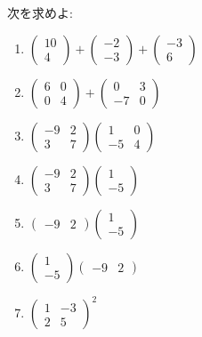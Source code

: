 \begin{quiz}
  次を求めよ:
  \begin{enumerate}
  \item
    $\begin{pmatrix}10\\4\end{pmatrix}+\begin{pmatrix}-2\\-3\end{pmatrix}+\begin{pmatrix}-3\\6\end{pmatrix}$
  \item
    $\begin{pmatrix}6&0\\0&4\end{pmatrix}+\begin{pmatrix}0&3\\-7&0\end{pmatrix}$
  \item
    $\begin{pmatrix}-9&2\\3&7\end{pmatrix}\begin{pmatrix}1&0\\-5&4\end{pmatrix}$
    \item
    $\begin{pmatrix}-9&2\\3&7\end{pmatrix}\begin{pmatrix}1\\-5\end{pmatrix}$
    \item
      $\begin{pmatrix}-9&2\end{pmatrix}\begin{pmatrix}1\\-5\end{pmatrix}$
      \item
        $\begin{pmatrix}1\\-5\end{pmatrix}\begin{pmatrix}-9&2\end{pmatrix}$
        \item
          $\begin{pmatrix}1&-3\\2&5\end{pmatrix}^2$
  \end{enumerate}
\end{quiz}



